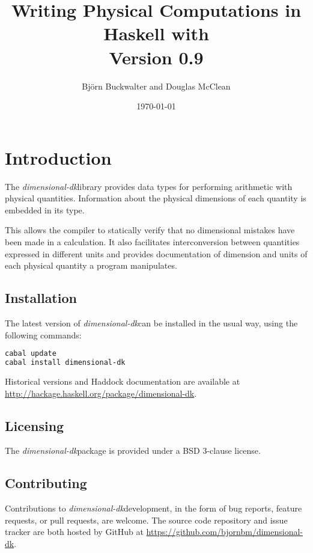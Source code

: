 \documentclass[12pt]{report}
\title{
	{Writing Physical Computations in Haskell with \thispackage}\\
	{\small{Version 0.9}}
}
\author{Björn Buckwalter and Douglas McClean}
\date{\today}
\newcommand{\packagename}[1]{\textit{#1}}
\newcommand{\thispackage}{\packagename{dimensional-dk}}
\begin{document}
\maketitle

\tableofcontents

\chapter{Introduction}

The \thispackage library provides data types for performing arithmetic with physical
quantities. Information about the physical dimensions of each quantity is embedded in
its type.

This allows the compiler to statically verify that no dimensional mistakes have been
made in a calculation. It also facilitates interconversion between quantities expressed
in different units and provides documentation of dimension and units of each physical
quantity a program manipulates.

\section{Installation}

The latest version of \thispackage can be installed in the usual way, using the following commands:

\begin{lstlisting}[language=bash]
cabal update
cabal install dimensional-dk
\end{lstlisting}

Historical versions and Haddock documentation are available at \url{http://hackage.haskell.org/package/dimensional-dk}.

\section{Licensing}

The \thispackage package is provided under a BSD 3-clause license.

\section{Contributing}

Contributions to \thispackage development, in the form of bug reports,
feature requests, or pull requests, are welcome. The source code repository and issue
tracker are both hosted by GitHub at \url{https://github.com/bjornbm/dimensional-dk}.
\end{document}
